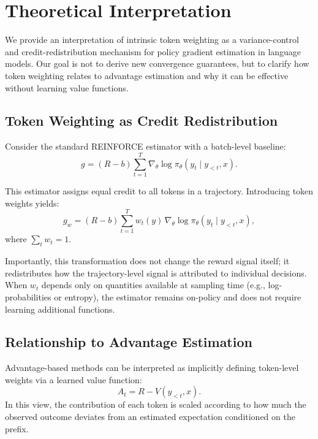 \section{Theoretical Interpretation}

We provide an interpretation of intrinsic token weighting as a variance-control and credit-redistribution mechanism for policy gradient estimation in language models. Our goal is not to derive new convergence guarantees, but to clarify how token weighting relates to advantage estimation and why it can be effective without learning value functions.

\subsection{Token Weighting as Credit Redistribution}

Consider the standard REINFORCE estimator with a batch-level baseline:
\begin{equation}
g = (R - b)\sum_{t=1}^{T} \nabla_\theta \log \pi_\theta(y_t \mid y_{<t}, x).
\end{equation}

This estimator assigns equal credit to all tokens in a trajectory. Introducing token weights yields:
\begin{equation}
g_w = (R - b)\sum_{t=1}^{T} w_t(y)\, \nabla_\theta \log \pi_\theta(y_t \mid y_{<t}, x),
\end{equation}
where $\sum_t w_t = 1$.

Importantly, this transformation does not change the reward signal itself; it redistributes how the trajectory-level signal is attributed to individual decisions. When $w_t$ depends only on quantities available at sampling time (e.g., log-probabilities or entropy), the estimator remains on-policy and does not require learning additional functions.

\subsection{Relationship to Advantage Estimation}

Advantage-based methods can be interpreted as implicitly defining token-level weights via a learned value function:
\begin{equation}
A_t = R - V(y_{<t}, x).
\end{equation}
In this view, the contribution of each token is scaled according to how much the observed outcome deviates from an estimated expectation conditioned on the prefix.

